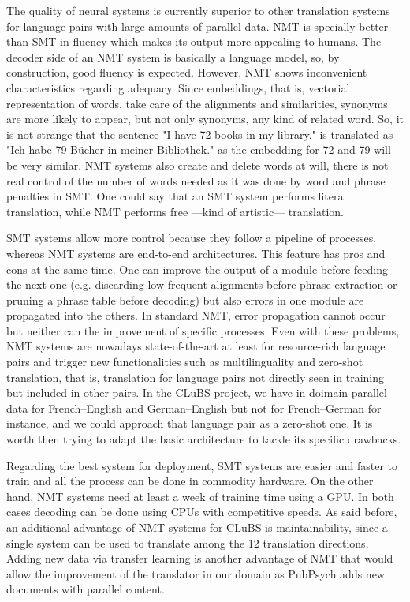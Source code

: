 \documentclass[a4paper,11pt]{article}
\begin{document}
The quality of neural systems is currently superior to other translation systems for language pairs with large amounts of parallel data.
NMT is specially better than SMT in fluency which makes its output more appealing to humans. The decoder side of an NMT system is basically a language model, so, by construction, good fluency is expected. However, NMT shows inconvenient characteristics regarding adequacy. Since embeddings, that is, vectorial representation of words, take care of the alignments and similarities, synonyms are more likely to appear, but not only synonyms, any kind of related word. So, it is not strange that the sentence "I have 72 books in my library." is translated as "Ich habe 79 Bücher in meiner Bibliothek." as the embedding for 72 and 79 will be very similar. NMT systems also create and delete words at will, there is not real control of the number of words needed as it was done by word and phrase penalties in SMT. One could say that an SMT system performs literal translation, while NMT performs free ---kind of artistic--- translation.

SMT systems allow more control because they follow a pipeline of processes, whereas NMT systems are end-to-end architectures. This feature has pros and cons at the same time. One can improve the output of a module before feeding the next one (e.g. discarding low frequent alignments before phrase extraction or pruning a phrase table before decoding) but also errors in one module are propagated into the others. In standard NMT, error propagation cannot occur but neither can the improvement of specific processes. Even with these problems, NMT systems are nowadays state-of-the-art at least for resource-rich language pairs and trigger new functionalities such as multilinguality and zero-shot translation, that is, translation for language pairs not directly seen in training but included in other pairs. In the CLuBS project, we have in-doimain parallel data for French--English and German--English but not for French--German for instance, and we could approach that language pair as a zero-shot one. It is worth then trying to adapt the basic architecture to tackle its specific drawbacks.

Regarding the best system for deployment, SMT systems are easier and faster to train and all the process can be done in commodity hardware. On the other hand, NMT systems need at least a week of training time using a GPU. In both cases decoding can be done using CPUs with competitive speeds. As said before, an additional advantage of NMT systems for CLuBS is maintainability, since a single system can be used to translate among the 12 translation directions. Adding new data via transfer learning is another advantage of NMT that would allow the improvement of the translator in our domain as PubPsych adds new documents with parallel content.
\end{document}
